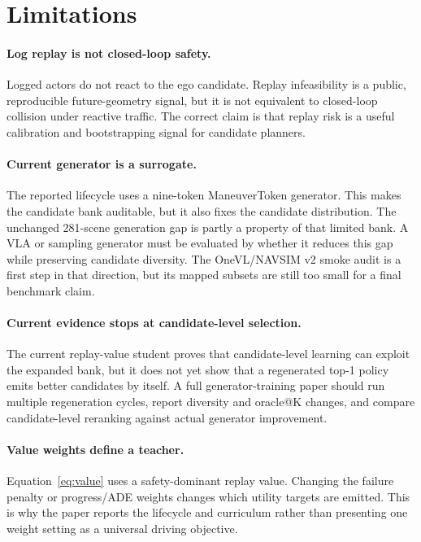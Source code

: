 \documentclass{article}
\begin{document}
\section{Limitations}
\label{sec:limitations}

\paragraph{Log replay is not closed-loop safety.}
Logged actors do not react to the ego candidate. Replay infeasibility is a public,
reproducible future-geometry signal, but it is not equivalent to closed-loop collision
under reactive traffic. The correct claim is that replay risk is a useful calibration and
bootstrapping signal for candidate planners.

\paragraph{Current generator is a surrogate.}
The reported lifecycle uses a nine-token ManeuverToken generator. This makes the
candidate bank auditable, but it also fixes the candidate distribution. The unchanged
281-scene generation gap is partly a property of that limited bank. A VLA or sampling
generator must be evaluated by whether it reduces this gap while preserving candidate
diversity. The OneVL/NAVSIM v2 smoke audit is a first step in that direction, but its
mapped subsets are still too small for a final benchmark claim.

\paragraph{Current evidence stops at candidate-level selection.}
The current replay-value student proves that candidate-level learning can exploit the
expanded bank, but it does not yet show that a regenerated top-1 policy emits better
candidates by itself. A full generator-training paper should run multiple regeneration
cycles, report diversity and oracle@K changes, and compare candidate-level reranking
against actual generator improvement.

\paragraph{Value weights define a teacher.}
Equation~\ref{eq:value} uses a safety-dominant replay value. Changing the failure penalty
or progress/ADE weights changes which utility targets are emitted. This is why the paper
reports the lifecycle and curriculum rather than presenting one weight setting as a
universal driving objective.
\end{document}
